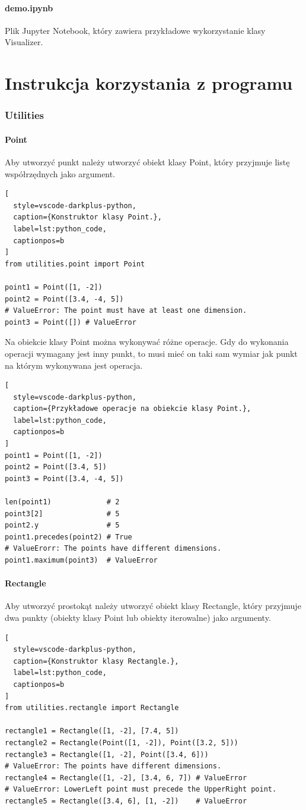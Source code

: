 \documentclass{lab}
\begin{document}
\subsection{demo.ipynb}
Plik Jupyter Notebook, który zawiera przykładowe wykorzystanie klasy Visualizer.

\newpage
\part{Instrukcja korzystania z programu}
\section{Utilities}
\subsection{Point}
Aby utworzyć punkt należy utworzyć obiekt klasy Point, który przyjmuje listę współrzędnych jako argument.
\begin{lstlisting}[
  style=vscode-darkplus-python,
  caption={Konstruktor klasy Point.},
  label=lst:python_code,
  captionpos=b
]
from utilities.point import Point

point1 = Point([1, -2])
point2 = Point([3.4, -4, 5])
# ValueError: The point must have at least one dimension.
point3 = Point([]) # ValueError
\end{lstlisting}
Na obiekcie klasy Point można wykonywać różne operacje. Gdy do wykonania operacji wymagany jest inny punkt, to musi mieć on taki sam wymiar jak punkt na którym wykonywana jest operacja.
\begin{lstlisting}[
  style=vscode-darkplus-python,
  caption={Przykładowe operacje na obiekcie klasy Point.},
  label=lst:python_code,
  captionpos=b
]
point1 = Point([1, -2])
point2 = Point([3.4, 5])
point3 = Point([3.4, -4, 5])

len(point1)             # 2
point3[2]               # 5
point2.y                # 5
point1.precedes(point2) # True
# ValueErorr: The points have different dimensions.
point1.maximum(point3)  # ValueError
\end{lstlisting}

\subsection{Rectangle}
Aby utworzyć prostokąt należy utworzyć obiekt klasy Rectangle, który przyjmuje dwa punkty (obiekty klasy Point lub obiekty iterowalne) jako argumenty.
\begin{lstlisting}[
  style=vscode-darkplus-python,
  caption={Konstruktor klasy Rectangle.},
  label=lst:python_code,
  captionpos=b
]
from utilities.rectangle import Rectangle

rectangle1 = Rectangle([1, -2], [7.4, 5])
rectangle2 = Rectangle(Point([1, -2]), Point([3.2, 5]))
rectangle3 = Rectangle([1, -2], Point([3.4, 6]))
# ValueError: The points have different dimensions.
rectangle4 = Rectangle([1, -2], [3.4, 6, 7]) # ValueError
# ValueError: LowerLeft point must precede the UpperRight point.
rectangle5 = Rectangle([3.4, 6], [1, -2])    # ValueError
\end{lstlisting}
\end{document}
